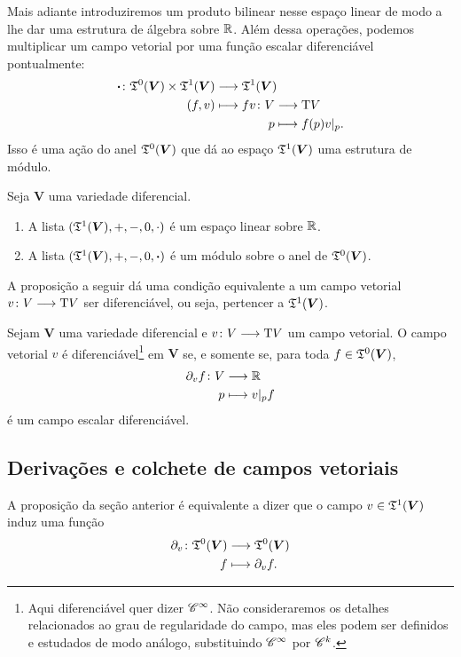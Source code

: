 Mais adiante introduziremos um produto bilinear nesse espaço linear de modo a lhe dar uma estrutura de álgebra sobre $\mathbb{R}$. Além dessa operações, podemos multiplicar um campo vetorial por uma função escalar diferenciável pontualmente:
	\begin{align*}
	\func{\bm\cdot}{\tens^0(\bm V) \times \tens^1(\bm V)}{\tens^1(\bm V)}{(f,v)}{
		\begin{aligned}[t]
		\func{fv}{V}{\Tg V}{p}{f(p)v|_p.}
		\end{aligned}
	}	
	\end{align*}
Isso é uma ação do anel $\mathfrak{T}^0(\bm V)$ que dá ao espaço $\mathfrak{T}^1(\bm V)$ uma estrutura de módulo.

\begin{proposition}
Seja $\bm V$ uma variedade diferencial.
	\begin{enumerate}
	\item A lista $(\mathfrak{T}^1(\bm V),+,-,0,\cdot)$ é um espaço linear sobre $\mathbb{R}$.
	\item A lista $(\mathfrak{T}^1(\bm V),+,-,0,\bm\cdot)$ é um módulo sobre o anel de $\mathfrak{T}^0(\bm V)$.
	\end{enumerate}
\end{proposition}

A proposição a seguir dá uma condição equivalente a um campo vetorial ${v}\colon {V} \longrightarrow {\mathrm{T}V}$ ser diferenciável, ou seja, pertencer a $\mathfrak{T}^1(\bm V)$.

\begin{proposition}
Sejam $\bm V$ uma variedade diferencial e ${v}\colon {V} \longrightarrow {\mathrm{T}V}$ um campo vetorial. O campo vetorial $v$ é diferenciável\footnote{Aqui diferenciável quer dizer $\mathscr{C}^\infty$. Não consideraremos os detalhes relacionados ao grau de regularidade do campo, mas eles podem ser definidos e estudados de modo análogo, substituindo $\mathscr{C}^\infty$ por $\mathscr{C}^k$.} em $\bm V$ se, e somente se, para toda $f \in \mathfrak{T}^0(\bm V)$,
	\begin{align*}
	{\partial_v f}\colon {V} &\longrightarrow {\mathbb{R}} \\{p} &\longmapsto v|_p f
	\end{align*}
é um campo escalar diferenciável.
\end{proposition}

\subsection{Derivações e colchete de campos vetoriais}

A proposição da seção anterior é equivalente a dizer que o campo $v \in \mathfrak{T}^1(\bm V)$ induz uma função
	\begin{align*}
	{\partial_v}\colon {\mathfrak{T}^0(\bm V)} &\longrightarrow {\mathfrak{T}^0(\bm V)} \\{f} &\longmapsto \partial_v f.
	\end{align*}

